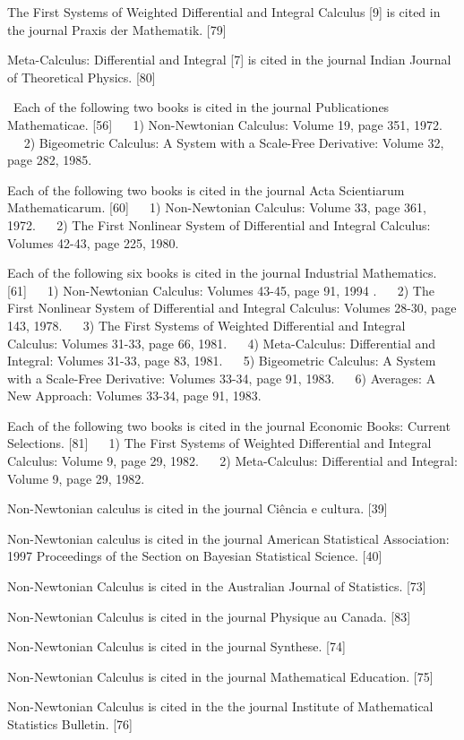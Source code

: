 \documentclass[12pt]{article}
\begin{document}
The First Systems of Weighted Differential and Integral Calculus [9] is cited in the journal Praxis der Mathematik. [79]

Meta-Calculus: Differential and Integral [7] is cited in the journal Indian Journal of Theoretical Physics. [80]

 Each of the following two books is cited in the journal Publicationes Mathematicae. [56]
   1) Non-Newtonian Calculus: Volume 19, page 351, 1972.
   2) Bigeometric Calculus: A System with a Scale-Free Derivative: Volume 32, page 282, 1985.

Each of the following two books is cited in the journal Acta Scientiarum Mathematicarum. [60] 
   1) Non-Newtonian Calculus: Volume 33, page 361, 1972.
   2) The First Nonlinear System of Differential and Integral Calculus: Volumes 42-43, page 225, 1980. 

Each of the following six books is cited in the journal Industrial Mathematics. [61]
   1) Non-Newtonian Calculus: Volumes 43-45, page 91, 1994 .
   2) The First Nonlinear System of Differential and Integral Calculus: Volumes 28-30, page 143, 1978.
   3) The First Systems of Weighted Differential and Integral Calculus: Volumes 31-33, page 66, 1981.
   4) Meta-Calculus: Differential and Integral: Volumes 31-33, page 83, 1981.
   5) Bigeometric Calculus: A System with a Scale-Free Derivative: Volumes 33-34, page 91, 1983.
   6) Averages: A New Approach: Volumes 33-34, page 91, 1983.

Each of the following two books is cited in the journal Economic Books: Current Selections. [81]
   1) The First Systems of Weighted Differential and Integral Calculus: Volume 9, page 29, 1982.
   2) Meta-Calculus: Differential and Integral: Volume 9, page 29, 1982. 

Non-Newtonian calculus is cited in the journal Ciência e cultura. [39]

Non-Newtonian calculus is cited in the journal American Statistical Association: 1997 Proceedings of the Section on Bayesian Statistical Science. [40]

Non-Newtonian Calculus is cited in the Australian Journal of Statistics. [73]

Non-Newtonian Calculus is cited in the journal Physique au Canada. [83]

Non-Newtonian Calculus is cited in the journal Synthese. [74]

Non-Newtonian Calculus is cited in the journal Mathematical Education. [75]

Non-Newtonian Calculus is cited in the the journal Institute of Mathematical Statistics Bulletin. [76]
\end{document}
